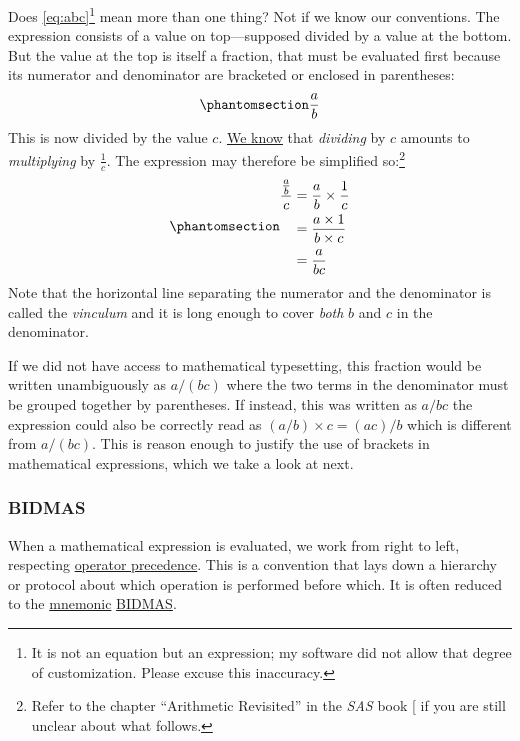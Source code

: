 \documentclass[
  a4paper,
]{article}
\begin{document}
Does \cref{eq:abc}\footnote{It is not an equation but an expression; my
  software did not allow that degree of customization. Please excuse
  this inaccuracy.} mean more than one thing? Not if we know our
conventions. The expression consists of a value on top---supposed
divided by a value at the bottom. But the value at the top is itself a
fraction, that must be evaluated first because its numerator and
denominator are bracketed or enclosed in parentheses:
\begin{equation}\phantomsection\label{eq:a-over-b}{
\frac{a}{b}
}\end{equation} This is now divided by the value \(c\).
\href{https://swanlotus.netlify.app/blogs/the-two-most-important-numbers-zero-and-one\#the-multiplicative-inverse-in-mathbbz-mathbbq-and-mathbbr}{We
know} that \emph{dividing} by \(c\) amounts to \emph{multiplying} by
\(\frac{1}{c}\). The expression may therefore be simplified
so:\footnote{Refer to the chapter ``Arithmetic Revisited'' in the
  \emph{SAS} book {[}\citeproc{ref-sas}{1}{]} if you are still unclear
  about what follows.}
\begin{equation}\phantomsection\label{eq:simplified}{
\begin{aligned}
\frac{\frac{a}{b}}{c} &= \frac{a}{b} \times \frac{1}{c}\\
&= \frac{a \times 1}{b \times c}\\
&= \frac{a}{bc}
\end{aligned}
}\end{equation} Note that the horizontal line separating the numerator
and the denominator is called the \emph{vinculum} and it is long enough
to cover \emph{both} \(b\) and \(c\) in the denominator.

If we did not have access to mathematical typesetting, this fraction
would be written unambiguously as \(a/(bc)\) where the two terms in the
denominator must be grouped together by parentheses. If instead, this
was written as \(a/bc\) the expression could also be correctly read as
\((a/b) \times c = (ac)/b\) which is different from \(a/(bc)\). This is
reason enough to justify the use of brackets in mathematical
expressions, which we take a look at next.

\subsubsection{BIDMAS}\label{bidmas}

When a mathematical expression is evaluated, we work from right to left,
respecting
\href{https://en.wikipedia.org/wiki/Order_of_operations}{operator
precedence}. This is a convention that lays down a hierarchy or protocol
about which operation is performed before which. It is often reduced to
the \href{https://www.dictionary.com/browse/mnemonic}{mnemonic}
\href{https://en.wikipedia.org/wiki/Order_of_operations\#Mnemonics}{BIDMAS}.
\end{document}
